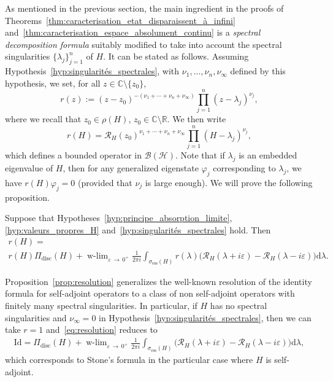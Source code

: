 \documentclass[10pt]{amsart}
\theoremstyle{definition}\newtheorem{defi}[theo]{Definition}\newtheorem{rema}[theo]{Remark}\newtheorem{exam}[theo]{Example}\newtheorem{exem}[theo]{Example}\newtheorem{nota}[theo]{Notation}
\newcommand{\Hi}{\mathcal{H}}
\newcommand{\bbC}{\mathbb{C}}
\newcommand{\R}{\mathbb{R}}
\newcommand{\ess}{\mathrm{ess}}
\newcommand{\rmd}{\mathrm{d}}
\newcommand{\disc}{\mathrm{disc}}
\newcommand{\Res}{\mathcal{R}}
\newcommand{\clB}{\mathcal{B}}
\DeclareMathOperator{\wlim}{w-lim}
\begin{document}
As mentioned in the previous section, the main ingredient in the proofs of Theorems~\ref{thm:caracterisation_etat_disparaissent_à_infini} and~\ref{thm:caracterisation_espace_absolument_continu} is a \emph{spectral decomposition formula} suitably modified to take into account the spectral singularities $\lbrace \lambda_j\rbrace_{j=1}^n$ of $H$. It can be stated as follows. Assuming Hypothesis~\ref{hyp:singularités_spectrales}, with $\nu_1,\dots,\nu_n,\nu_\infty$ defined by this hypothesis, we set, for all $z\in\bbC\setminus\{z_0\}$,
\begin{equation}\label{eq:def_r}
r(z) := (z-z_0)^{-(\nu_1+\cdots+\nu_n+\nu_\infty)} \prod_{j=1}^n \left(z-\lambda_j\right)^{\nu_j},
\end{equation}
where we recall that $z_0\in\rho(H)$, $z_0\in\bbC\setminus\R$. We then write
\begin{equation*}
r(H) = \Res_H(z_0)^{\nu_1+\cdots+\nu_n+\nu_\infty} \prod_{j=1}^n \left(H-\lambda_j\right)^{\nu_j},
\end{equation*}
which defines a bounded operator in $\clB(\Hi)$. Note that if $\lambda_j$ is an embedded eigenvalue of $H$, then for any generalized eigenstate $\varphi_j$ corresponding to $\lambda_j$, we have $r(H)\varphi_j=0$ (provided that $\nu_j$ is large enough). We will prove the following proposition.

\begin{prop}\label{prop:resolution}
Suppose that Hypotheses~\ref{hyp:principe_absorption_limite}, \ref{hyp:valeurs_propres_H} and~\ref{hyp:singularités_spectrales} hold. Then
\begin{multline}\label{eq:resolution}
r(H) =\\
r(H)\Pi_{\disc}(H) + \wlim_{\varepsilon\,\rightarrow \,0^+}\frac{1}{2\pi i}\int_{\sigma_{\ess}(H)}r(\lambda)\big(\Res_{H}(\lambda+i\varepsilon)-\Res_{H}(\lambda-i\varepsilon)\big)\rmd \lambda. 
\end{multline}
\end{prop}

Proposition~\ref{prop:resolution} generalizes the well-known resolution of the identity formula for self-adjoint operators to a class of non self-adjoint operators with finitely many spectral singularities. In particular, if $H$ has no spectral singularities and $\nu_\infty=0$ in Hypothesis~\ref{hyp:singularités_spectrales}, then we can take $r=1$ and~\eqref{eq:resolution} reduces to
\begin{align*}
\mathrm{Id} = \Pi_{\disc}(H) + \wlim_{\varepsilon\,\rightarrow\,0^+}\frac{1}{2\pi i}\int_{\sigma_{\ess}(H)}\big(\Res_{H}(\lambda+i\varepsilon)-\Res_{H}(\lambda-i\varepsilon)\big)\rmd \lambda,
\end{align*}
which corresponds to Stone's formula in the particular case where $H$ is self-adjoint.
\end{document}
